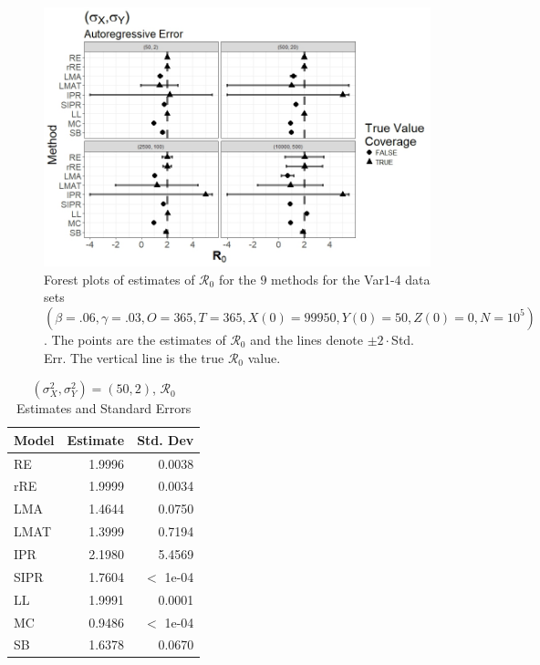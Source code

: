 \documentclass[12pt]{article}
\newcommand{\xxsir}{\ensuremath{9} } %
\newcommand{\rr}{\ensuremath{\mathcal{R}_0}}
\begin{document}
\begin{figure}[H]
	\begin{center}
		\includegraphics[scale=0.5]{images/var_ar.jpeg}
		\caption{Forest plots of estimates of $\rr$ for the \xxsir methods for the Var1-4 data sets $(\beta=.06, \gamma=.03, O=365, T=365, X(0)=99950, Y(0)=50, Z(0)=0, N=10^5)$.  The points are the estimates of $\rr$ and the lines denote $\pm 2\cdot $Std. Err.  The vertical line is the true $\rr$ value.}
	\end{center}
\end{figure}

\begin{table}[H]
	
	
	\centering
	\begin{tabular}[t]{l|r|r}
		\hline
		Model & Estimate & Std. Dev\\
		\hline
		RE & 1.9996 & 0.0038\\
		\hline
		rRE & 1.9999 & 0.0034\\
		\hline
		LMA & 1.4644 & 0.0750\\
		\hline
		LMAT & 1.3999 & 0.7194\\
		\hline
		IPR & 2.1980 & 5.4569\\
		\hline
		SIPR & 1.7604 & $<$ 1e-04\\
		\hline
		LL & 1.9991 & 0.0001\\
		\hline
		MC & 0.9486 & $<$ 1e-04\\
		\hline
		SB & 1.6378 & 0.0670\\
		\hline
	\end{tabular}
	\caption{ $(\sigma^2_X, \sigma^2_Y) = (50, 2)$, $\rr$ Estimates and Standard Errors}
\end{table}
\end{document}
